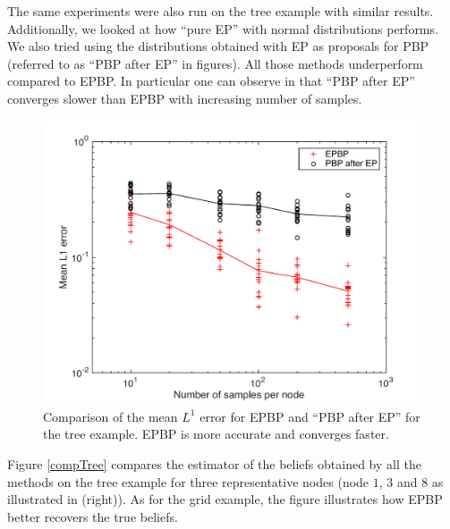 %
%
%
The same experiments were also run on the tree example with similar results.
Additionally, we looked at how ``pure EP'' with normal distributions performs. We also tried using the distributions obtained with EP as proposals for PBP (referred to as ``PBP after EP'' in figures). All those methods underperform compared to EPBP. In particular one can observe in  that ``PBP after EP'' converges slower than EPBP with increasing number of samples.
%
%
%
\begin{figure}[!h]
\center
\includegraphics[width=.6\textwidth]{figures/epbp/errComparisonEP}
\caption{\label{compPBPaEP}Comparison of the mean $L^{1}$ error for EPBP and ``PBP after EP'' for the tree example. EPBP is more accurate and converges faster. }
\end{figure}


Figure \ref{compTree} compares the estimator of the beliefs obtained by all the methods on the tree example for three representative nodes (node $1$, $3$ and $8$ as illustrated in  (right)). As for the grid example, the figure illustrates how EPBP better recovers the true beliefs. 


